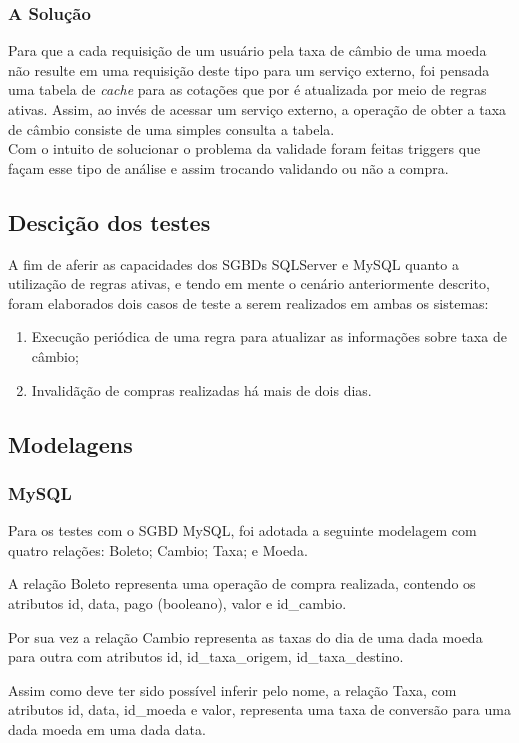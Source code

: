 \documentclass[conference]{IEEEtran}
\begin{document}
    \subsubsection{A Solução} Para que a cada requisição de um usuário pela taxa de câmbio de uma moeda não resulte em uma requisição deste tipo para um serviço externo, foi pensada uma tabela de \textit{cache} para as cotações que por é atualizada por meio de regras ativas. Assim, ao invés de acessar um serviço externo, a operação de obter a taxa de câmbio consiste de uma simples consulta a tabela.\\
    Com o intuito de solucionar o problema da validade foram feitas triggers que façam esse tipo de análise e assim trocando validando ou não a compra.

  \subsection{Descição dos testes}
  A fim de aferir as capacidades dos SGBDs SQLServer e MySQL quanto a utilização de regras ativas, e tendo em mente o cenário anteriormente descrito, foram elaborados dois casos de teste a serem realizados em ambas os sistemas:

  \begin{enumerate}
    \item Execução periódica de uma regra para atualizar as informações sobre taxa de câmbio;
    \item Invalidãção de compras realizadas há mais de dois dias.
  \end{enumerate}

  \subsection{Modelagens}
    \subsubsection{MySQL}
    Para os testes com o SGBD MySQL, foi adotada a seguinte modelagem com quatro relações: Boleto; Cambio; Taxa; e Moeda.

    A relação Boleto representa uma operação de compra realizada, contendo os atributos id, data, pago (booleano), valor e id\_cambio.

    Por sua vez a relação Cambio representa as taxas do dia de uma dada moeda para outra com atributos id, id\_taxa\_origem, id\_taxa\_destino.

    Assim como deve ter sido possível inferir pelo nome, a relação Taxa, com atributos id, data, id\_moeda e valor, representa uma taxa de conversão para uma dada moeda em uma dada data.
\end{document}
